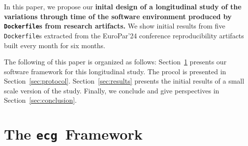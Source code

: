 \documentclass[sigconf,natbib=false]{acmart}
\newcommand{\df}{\texttt{Dockerfile}}
\newcommand{\ecg}{\texttt{ecg}}
\newcommand{\todo}[1]{{\color{red}{TODO: #1}}}
\begin{document}


In this paper, we propose our \textbf{inital design of a longitudinal study of the variations through time of the software environment produced by \df s from research artifacts.}
We show initial results from five \df s extracted from the EuroPar'24 conference reproducibility artifacts built every month for six months.

% 

The following of this paper is organized as follows:
Section~\ref{sec:ecg} presents our software framework for this longitudinal study.
The procol is presented in Section~\ref{sec:protocol}.
Section~\ref{sec:results} presents the initial results of a small scale version of the study.
Finally, we conclude and give perspectives in Section~\ref{sec:conclusion}.

\section{The \ecg\ Framework}\label{sec:ecg}

\end{document}

